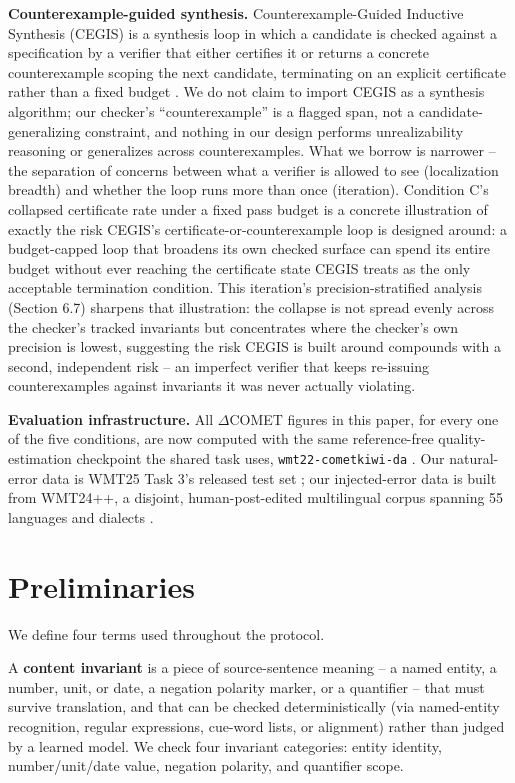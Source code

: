 \documentclass[11pt,letterpaper]{article}
\begin{document}
\textbf{Counterexample-guided synthesis.} Counterexample-Guided Inductive Synthesis (CEGIS) is a synthesis loop in which a candidate is checked against a specification by a verifier that either certifies it or returns a concrete counterexample scoping the next candidate, terminating on an explicit certificate rather than a fixed budget \citep{Jha2015}. We do not claim to import CEGIS as a synthesis algorithm; our checker's ``counterexample'' is a flagged span, not a candidate-generalizing constraint, and nothing in our design performs unrealizability reasoning or generalizes across counterexamples. What we borrow is narrower -- the separation of concerns between what a verifier is allowed to see (localization breadth) and whether the loop runs more than once (iteration). Condition C's collapsed certificate rate under a fixed pass budget is a concrete illustration of exactly the risk CEGIS's certificate-or-counterexample loop is designed around: a budget-capped loop that broadens its own checked surface can spend its entire budget without ever reaching the certificate state CEGIS treats as the only acceptable termination condition. This iteration's precision-stratified analysis (Section 6.7) sharpens that illustration: the collapse is not spread evenly across the checker's tracked invariants but concentrates where the checker's own precision is lowest, suggesting the risk CEGIS is built around compounds with a second, independent risk -- an imperfect verifier that keeps re-issuing counterexamples against invariants it was never actually violating.

\textbf{Evaluation infrastructure.} All $\Delta$COMET figures in this paper, for every one of the five conditions, are now computed with the same reference-free quality-estimation checkpoint the shared task uses, \texttt{wmt22-cometkiwi-da} \citep{Rei2022}. Our natural-error data is WMT25 Task 3's released test set \citep{Lavie2025}; our injected-error data is built from WMT24++, a disjoint, human-post-edited multilingual corpus spanning 55 languages and dialects \citep{Deutsch2025}.

\section{Preliminaries}

We define four terms used throughout the protocol.

A \textbf{content invariant} is a piece of source-sentence meaning -- a named entity, a number, unit, or date, a negation polarity marker, or a quantifier -- that must survive translation, and that can be checked deterministically (via named-entity recognition, regular expressions, cue-word lists, or alignment) rather than judged by a learned model. We check four invariant categories: entity identity, number/unit/date value, negation polarity, and quantifier scope.
\end{document}
